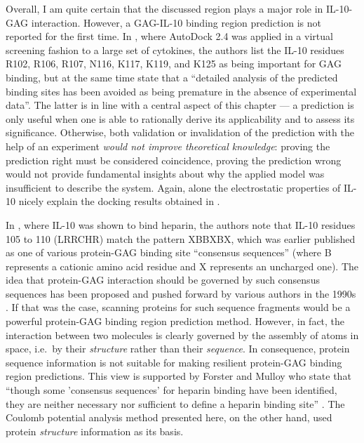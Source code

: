 Overall, I am quite certain that the discussed region plays a major role in
IL-10-GAG interaction. However, a GAG-IL-10 binding region prediction is not
reported for the first time. In \cite{mulloy_forster_2008_4helixcytokines},
where AutoDock 2.4 \cite{autodock24} was applied in a virtual screening fashion
to a large set of cytokines, the authors list the IL-10 residues R102, R106,
R107, N116, K117, K119, and K125 as being important for GAG binding, but at the
same time state that a \enquote{detailed analysis of the predicted binding sites
has been avoided as being premature in the absence of experimental data}. The
latter is in line with a central aspect of this chapter --- a prediction is only
useful when one is able to rationally derive its applicability and to assess its
significance. Otherwise, both validation or invalidation of the prediction with
the help of an experiment \textit{would not improve theoretical knowledge}:
proving the prediction right must be considered coincidence, proving the
prediction wrong would not provide fundamental insights about why the applied
model was insufficient to describe the system. Again, alone the electrostatic
properties of IL-10 nicely explain the docking results obtained in
\cite{mulloy_forster_2008_4helixcytokines}.

In \cite{salek_ardakani_2000}, where IL-10 was shown to bind heparin, the
authors note that IL-10 residues 105 to 110 (LRRCHR) match the pattern XBBXBX,
which was earlier published as one of various protein-GAG binding site
\enquote{consensus sequences} (where B represents a cationic amino acid residue
and X represents an uncharged one). The idea that protein-GAG interaction should
be governed by such consensus sequences has been proposed and pushed forward by
various authors in the 1990s \cite{mccaffrey_1992,
cardin_weintraub_1989,fromm_1997,caldwell_1996,hileman_1998}. If that was the
case, scanning proteins for such sequence fragments would be a powerful
protein-GAG binding region prediction method. However, in fact, the interaction
between two molecules is clearly governed by the assembly of atoms in space,
i.e.\ by their \textit{structure} rather than their \textit{sequence}. In
consequence, protein sequence information is not suitable for making resilient
protein-GAG binding region predictions. This view is supported by Forster and
Mulloy who state that \enquote{though some 'consensus sequences' for heparin
binding have been identified, they are neither necessary nor sufficient to
define a heparin binding site} \cite{hp_binding_sites_mulloy_2006}. The Coulomb
potential analysis method presented here, on the other hand, used protein
\textit{structure} information as its basis.

